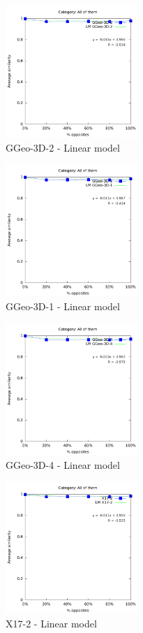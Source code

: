 \documentclass[a4paper,10pt]{article}
\begin{document}
\begin{figure}[ht]{\centering
\includegraphics[height=5cm]{allcat_GGeo-3D-2_LM.pdf}
\caption{GGeo-3D-2 - Linear model}
}\end{figure}
\begin{figure}[ht]{\centering
\includegraphics[height=5cm]{allcat_GGeo-3D-1_LM.pdf}
\caption{GGeo-3D-1 - Linear model}
}\end{figure}
\begin{figure}[ht]{\centering
\includegraphics[height=5cm]{allcat_GGeo-3D-4_LM.pdf}
\caption{GGeo-3D-4 - Linear model}
}\end{figure}
\begin{figure}[ht]{\centering
\includegraphics[height=5cm]{allcat_X17-2_LM.pdf}
\caption{X17-2 - Linear model}
}\end{figure}
\end{document}
